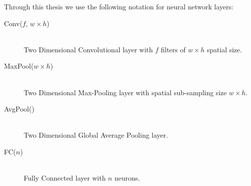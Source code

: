 \documentclass[a4paper, notoc, oneside, openany]{tufte-book} %
\begin{document}
Through this thesis we use the following notation for neural network layers:

\begin{description}
	\item[Conv($f$, $w \times h$)] \hfill \\
		Two Dimensional Convolutional layer with $f$ filters of $w \times h$ spatial size.
	\item[MaxPool($w \times h$)] \hfill \\
		Two Dimensional Max-Pooling layer with spatial sub-sampling size $w \times h$.
	\item[AvgPool()] \hfill \\
		Two Dimensional Global Average Pooling layer.
	\item[FC($n$)] \hfill \\
		Fully Connected layer with $n$ neurons.
	
\end{description}

\mainmatter
\pagestyle{mainmatter}













\appendix


\backmatter





\end{document}
